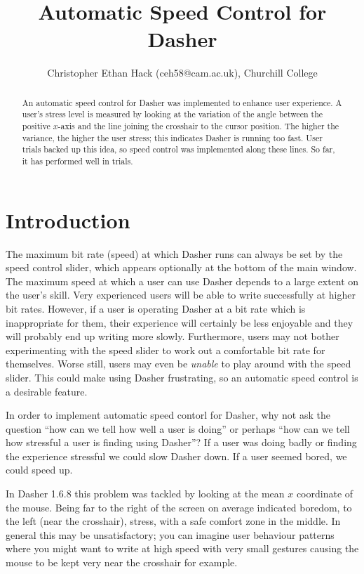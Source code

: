 \documentclass[a4paper,11pt,notitlepage]{article}
\author{\footnotesize{Christopher Ethan Hack (ceh58@cam.ac.uk), Churchill College}}
\title{\textbf{Automatic Speed Control for Dasher}}
\begin{document}
\maketitle

\begin{abstract}
An automatic speed control for Dasher was implemented to enhance user
experience. A user's stress level is measured by looking at the
variation of the angle between the positive $x$-axis and the line
joining the crosshair to the cursor position. The higher the variance,
the higher the user stress; this indicates Dasher is running too
fast. User trials backed up this idea, so speed control was
implemented along these lines. So far, it has performed well in
trials.
\end{abstract}

\section{Introduction}\label{sec:Intro}

The maximum bit rate (speed) at which Dasher runs can always be set by the
speed control slider, which appears optionally at the bottom of the main
window. The maximum speed at which a user can use Dasher depends to a large
extent on the user's skill. Very experienced users will be able to write
successfully at higher bit rates. However, if a user is operating Dasher at a
bit rate which is inappropriate for them, their experience will certainly be
less enjoyable and they will probably end up writing more slowly. Furthermore,
users may not bother experimenting with the speed slider to work out a
comfortable bit rate for themselves. Worse still, users may even be
\emph{unable} to play around with the speed slider. This could make using
Dasher frustrating, so an automatic speed control is a desirable feature.

In order to implement automatic speed contorl for Dasher, why not ask
the question ``how can we tell how well a user is doing'' or perhaps
``how can we tell how stressful a user is finding using Dasher''? If
a user was doing badly or finding the experience stressful we could
slow Dasher down. If a user seemed bored, we could speed up.

In Dasher 1.6.8 this problem was tackled by looking at the mean $x$
coordinate of the mouse. Being far to the right of the screen on
average indicated boredom, to the left (near the crosshair), stress,
with a safe comfort zone in the middle. In general this may be
unsatisfactory; you can imagine user behaviour patterns where you
might want to write at high speed with very small gestures causing
the mouse to be kept very near the crosshair for example.
\end{document}
